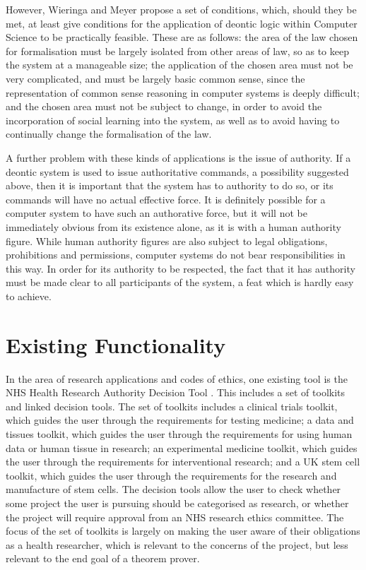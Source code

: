 \documentclass{l4proj}
\begin{document}
However, Wieringa and Meyer propose a set of conditions, which, should they be met, at least give conditions for the application of deontic logic within Computer Science to be practically feasible. These are as follows: the area of the law chosen for formalisation must be largely isolated from other areas of law, so as to keep the system at a manageable size; the application of the chosen area must not be very complicated, and must be largely basic common sense, since the representation of common sense reasoning in computer systems is deeply difficult; and the chosen area must not be subject to change, in order to avoid the incorporation of social learning into the system, as well as to avoid having to continually change the formalisation of the law. 

A further problem with these kinds of applications is the issue of authority. If a deontic system is used to issue authoritative commands, a possibility suggested above, then it is important that the system has to authority to do so, or its commands will have no actual effective force. It is definitely possible for a computer system to have such an authorative force, but it will not be immediately obvious from its existence alone, as it is with a human authority figure. While human authority figures are also subject to legal obligations, prohibitions and permissions, computer systems do not bear responsibilities in this way. In order for its authority to be respected, the fact that it has authority must be made clear to all participants of the system, a feat which is hardly easy to achieve. 

\section{Existing Functionality}
In the area of research applications and codes of ethics, one existing tool is the NHS Health Research Authority Decision Tool \cite{NHS}. This includes a set of toolkits and linked decision tools. The set of toolkits includes a clinical trials toolkit, which guides the user through the requirements for testing medicine; a data and tissues toolkit, which guides the user through  the requirements for using human data or human tissue in research; an experimental medicine toolkit, which guides the user through the requirements for interventional research; and a UK stem cell toolkit, which guides the user through the requirements for the research and manufacture of stem cells. The decision tools allow the user to check whether some project the user is pursuing should be categorised as research, or whether the project will require approval from an NHS research ethics committee. The focus of the set of toolkits is largely on making the user aware of their obligations as a health researcher, which is relevant to the concerns of the project, but less relevant to the end goal of a theorem prover. 
\end{document}
